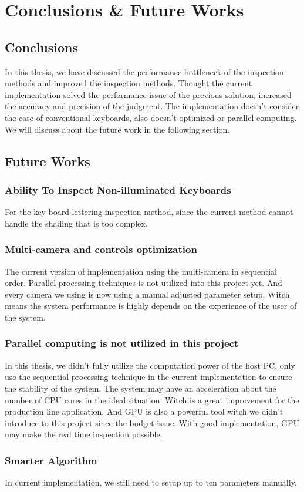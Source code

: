 \chapter{Conclusions \& Future Works}
\label{c:conclusion-and-future-works}

\section{Conclusions}
	In this thesis, we have discussed the performance bottleneck of the inspection methods and improved the inspection methods.
	Thought the current implementation solved the performance issue of the previous solution, increased the accuracy and precision of the judgment.
	The implementation doesn't consider the case of conventional keyboards, also doesn't optimized or parallel computing.
	We will discuss about the future work in the following section.

\section{Future Works}
	\subsection{Ability To Inspect Non-illuminated Keyboards}
		For the key board lettering inspection method, since the current method cannot handle the shading that is too complex.

	\subsection{Multi-camera and controls optimization}
		The current version of implementation using the multi-camera in sequential order. Parallel processing techniques is not utilized into this project yet.
		And every camera we using is now using a manual adjusted parameter setup. Witch means the system performance is highly depends on the experience of the user of the system.


	\subsection{Parallel computing is not utilized in this project}
		In this thesis, we didn't fully utilize the computation power of the host PC, only use the sequential processing technique in the current implementation to ensure the stability of the system.
		The system may have an acceleration about the number of CPU cores in the ideal situation. 
		Witch is a great improvement for the production line application.
		And GPU is also a powerful tool witch we didn't introduce to this project since the budget issue.
		With good implementation, GPU may make the real time inspection possible.
	
	\subsection{Smarter Algorithm}
		In current implementation, we still need to setup up to ten parameters manually, 